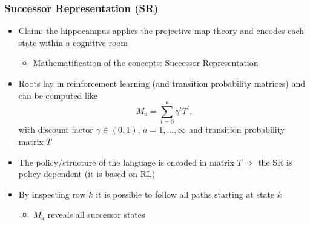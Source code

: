 
\begin{frame}[label={frame: sr}]
\frametitle{Successor Representation (SR)}
	\begin{itemize}
		\item<1-> Claim: the hippocampus applies the projective map theory and encodes each state within a cognitive room
		\begin{itemize}
                \item<4-> Mathematification of the concepts: Successor Representation
		\end{itemize}
		\item<5-> Roots lay in reinforcement learning (and transition probability matrices) and can be computed like
		\[
		M_a = \sum_{t=0}^{a}{ \gamma^tT^t }
		\text{,}
		\]
		with discount factor $ \gamma \in (0, 1) $, $ a = 1, ..., \infty $ and transition probability matrix $ T $ %
		\item<6-> The policy/structure of the language is encoded in matrix $ T \Longrightarrow $ the SR is policy-dependent (it is based on RL) %
		\item<7-> By inspecting row $ k $ it is possible to follow all paths starting at state $ k $
		\begin{itemize}
			\setlength{\itemindent}{2em}
			\item<8->[$\Longrightarrow$] $ M_a $ reveals all successor states %
		\end{itemize}
	\end{itemize}
\end{frame}

